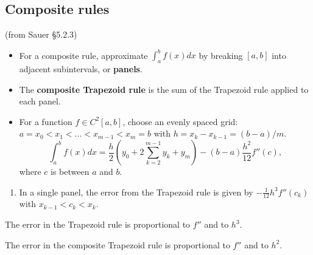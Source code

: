 \documentclass[12pt,letterpaper,noanswers]{exam}
\begin{document}
\subsection*{Composite rules}
\begin{tcolorbox}
(from Sauer \S 5.2.3)
\begin{itemize}
\itemsep0pt
    \item For a composite rule, approximate $\displaystyle\int_a^b f(x)dx$ by breaking $[a,b]$ into adjacent subintervals, or \textbf{panels}.
    \item The \textbf{composite Trapezoid rule} is the sum of the Trapezoid rule applied to each panel.
    \item For a function $f\in C^2[a,b]$, choose an evenly spaced grid: $a = x_0<x_1<...<x_{m-1}<x_m = b$ with $h = x_k-x_{k-1} = (b-a)/m$.  \[\displaystyle\int_a^b f(x)dx = \frac{h}{2}\left(y_0 + 2\sum\limits_{k=2}^{m-1}y_k + y_m \right) - (b-a)\frac{h^2}{12}f''(c),\] where $c$ is between $a$ and $b$.
\end{itemize}
\end{tcolorbox}
\begin{enumerate}[resume=classQ]
    \item In a single panel, the error from the Trapezoid rule is given by $-\frac{1}{12}h^3f''(c_k)$ with $x_{k-1}<c_k<x_k$.
\end{enumerate}

The error in the Trapezoid rule is proportional to $f''$ and to $h^3$.

The error in the composite Trapezoid rule is proportional to $f''$ and to $h^2$.
\end{document}
